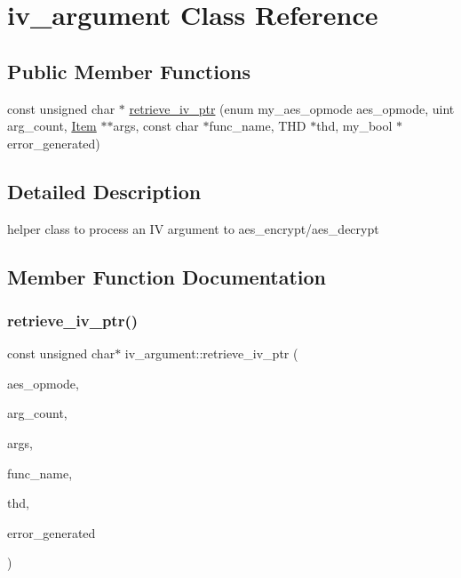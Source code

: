 \hypertarget{classiv__argument}{}\section{iv\+\_\+argument Class Reference}
\label{classiv__argument}
\subsection*{Public Member Functions}
\begin{DoxyCompactItemize}
\item 
const unsigned char $\ast$ \mbox{\hyperlink{classiv__argument_a702ce75039fecd27a60e92cc174cfdac}{retrieve\+\_\+iv\+\_\+ptr}} (enum my\+\_\+aes\+\_\+opmode aes\+\_\+opmode, uint arg\+\_\+count, \mbox{\hyperlink{classItem}{Item}} $\ast$$\ast$args, const char $\ast$func\+\_\+name, T\+HD $\ast$thd, my\+\_\+bool $\ast$error\+\_\+generated)
\end{DoxyCompactItemize}


\subsection{Detailed Description}
helper class to process an IV argument to aes\+\_\+encrypt/aes\+\_\+decrypt 

\subsection{Member Function Documentation}
\mbox{\label{classiv__argument_a702ce75039fecd27a60e92cc174cfdac}} 
\subsubsection{\texorpdfstring{retrieve\+\_\+iv\+\_\+ptr()}{retrieve\_iv\_ptr()}}
{\footnotesize\ttfamily const unsigned char$\ast$ iv\+\_\+argument\+::retrieve\+\_\+iv\+\_\+ptr (\begin{DoxyParamCaption}\item[{enum my\+\_\+aes\+\_\+opmode}]{aes\+\_\+opmode,  }\item[{uint}]{arg\+\_\+count,  }\item[{\mbox{\hyperlink{classItem}{Item}} $\ast$$\ast$}]{args,  }\item[{const char $\ast$}]{func\+\_\+name,  }\item[{T\+HD $\ast$}]{thd,  }\item[{my\+\_\+bool $\ast$}]{error\+\_\+generated }\end{DoxyParamCaption})\hspace{0.3cm}{\ttfamily [inline]}}

